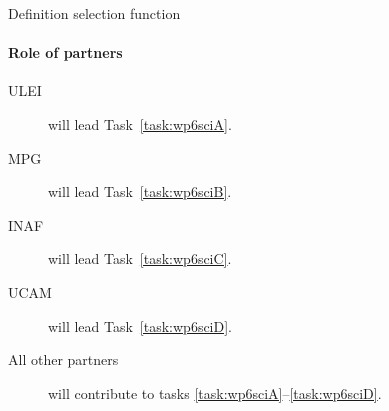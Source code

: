 \begin{workpackage}{Definition selection function}
\begin{wpdescription}
    \paragraph{Role of partners}
    \begin{description}
      \item[ULEI] will lead Task~\ref{task:wp6sciA}.
      \item[MPG] will lead Task~\ref{task:wp6sciB}.
      \item[INAF] will lead Task~\ref{task:wp6sciC}.
      \item[UCAM] will lead Task~\ref{task:wp6sciD}.
      \item[All other partners] will contribute to tasks \ref{task:wp6sciA}--\ref{task:wp6sciD}.
    \end{description}
  \end{wpdescription}

  \begin{wpdeliverables}
  \end{wpdeliverables}

\end{workpackage}


